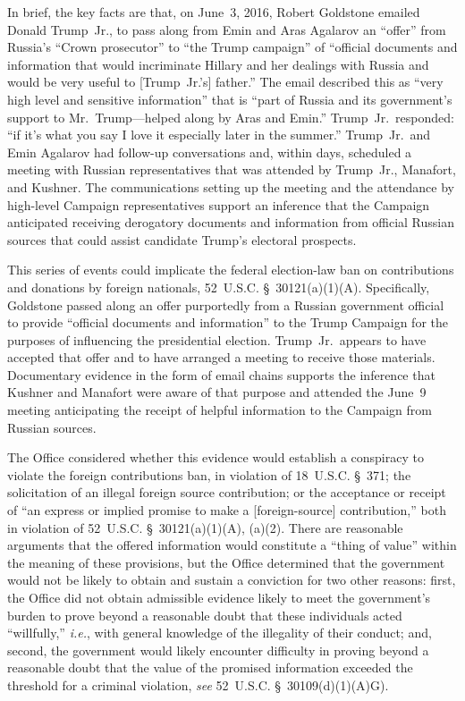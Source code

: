 In brief, the key facts are that, on June~3, 2016, Robert Goldstone emailed Donald Trump~Jr., to pass along from Emin and Aras Agalarov an ``offer'' from Russia's ``Crown prosecutor'' to ``the Trump campaign'' of ``official documents and information that would incriminate Hillary and her dealings with Russia and would be very useful to [Trump~Jr.'s] father.''
The email described this as ``very high level and sensitive information'' that is ``part of Russia and its government's support to Mr.~Trump---helped along by Aras and Emin.''
Trump~Jr.\ responded: ``if it's what you say I love it especially later in the summer.''
Trump~Jr.\ and Emin Agalarov had follow-up conversations and, within days, scheduled a meeting with Russian representatives that was attended by Trump~Jr., Manafort, and Kushner.
The communications setting up the meeting and the attendance by high-level Campaign representatives support an inference that the Campaign anticipated receiving derogatory documents and information from official Russian sources that could assist candidate Trump's electoral prospects.

This series of events could implicate the federal election-law ban on contributions and donations by foreign nationals, 52~U.S.C. \S~30121(a)(1)(A).
Specifically, Goldstone passed along an offer purportedly from a Russian government official to provide ``official documents and information'' to the Trump Campaign for the purposes of influencing the presidential election.
Trump~Jr.\ appears to have accepted that offer and to have arranged a meeting to receive those materials.
Documentary evidence in the form of email chains supports the inference that Kushner and Manafort were aware of that purpose and attended the June~9 meeting anticipating the receipt of helpful information to the Campaign from Russian sources.

The Office considered whether this evidence would establish a conspiracy to violate the foreign contributions ban, in violation of 18~U.S.C. \S~371; the solicitation of an illegal foreign source contribution; or the acceptance or receipt of ``an express or implied promise to make a [foreign-source] contribution,'' both in violation of 52~U.S.C. \S~30121(a)(1)(A), (a)(2).
There are reasonable arguments that the offered information would constitute a ``thing of value'' within the meaning of these provisions, but the Office determined that the government would not be likely to obtain and sustain a conviction for two other reasons: first, the Office did not obtain admissible evidence likely to meet the government's burden to prove beyond a reasonable doubt that these individuals acted ``willfully,'' \textit{i.e.}, with general knowledge of the illegality of their conduct; and, second, the government would likely encounter difficulty in proving beyond a reasonable doubt that the value of the promised information exceeded the threshold for a criminal violation, \textit{see} 52~U.S.C. \S~30109(d)(1)(A)G).

